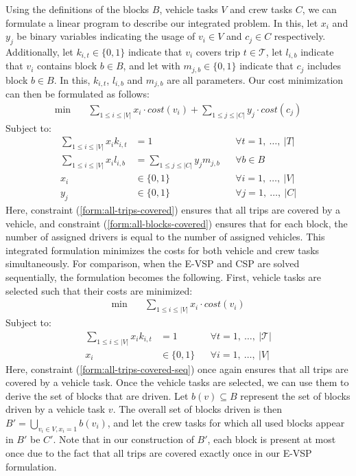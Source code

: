 \documentclass[]{article}
\begin{document}
Using the definitions of the blocks $B$, vehicle tasks $V$ and crew tasks $C$, we can formulate a linear program to describe our integrated problem. In this, let $x_i$ and $y_j$ be binary variables indicating the usage of $v_i \in V$ and $c_j \in C$ respectively. Additionally, let $k_{i,t} \in \{ 0, 1 \}$ indicate that $v_i$ covers trip $t \in \mathcal{T}$, let $l_{i,b}$ indicate that $v_i$ contains block $b \in B$, and let with $m_{j,b} \in \{ 0, 1 \} $ indicate that $c_j$ includes block $b \in B$. In this, $k_{i,t}$, $l_{i,b}$ and $m_{j,b}$ are all parameters. Our cost minimization can then be formulated as follows:
\begin{align}
\min \quad
& \sum_{1 \leq i \leq |V|} x_{i} \cdot cost(v_i) + \sum_{1 \leq j \leq |C|} y_{j} \cdot cost(c_j)  
\end{align}
Subject to:
\begin{align}
\sum_{1 \leq i \leq |V|} x_{i}k_{i,t} &= 1 && \forall t = 1,\:\dots,\:|T| \label{form:all-trips-covered} \\
\sum_{1 \leq i \leq |V|}x_i l_{i,b}  &= \sum_{1 \leq j \leq |C|}y_j m_{j,b}  && \forall b \in B \label{form:all-blocks-covered} \\
x_{i} &\in \{ 0, 1 \} && \forall i = 1,\:\dots,\:|V| \\
y_{j} &\in \{ 0, 1 \} && \forall j = 1,\:\dots,\:|C|
\end{align}
Here, constraint (\ref{form:all-trips-covered}) ensures that all trips are covered by a vehicle, and constraint (\ref{form:all-blocks-covered}) ensures that for each block, the number of assigned drivers is equal to the number of assigned vehicles. This integrated formulation minimizes the costs for both vehicle and crew tasks simultaneously. For comparison, when the E-VSP and CSP are solved sequentially, the formulation becomes the following. First, vehicle tasks are selected such that their costs are minimized:
\begin{align}
\min \quad
& \sum_{1 \leq i \leq |V|} x_{i} \cdot cost(v_i)
\end{align}
Subject to:
\begin{align}
\sum_{1 \leq i \leq |V|} x_{i}k_{i,t} &= 1 && \forall t = 1,\:\dots,\:|\mathcal{T}| \label{form:all-trips-covered-seq} \\
x_{i} &\in \{ 0, 1 \} && \forall i = 1,\:\dots,\:|V|
\end{align}
Here, constraint (\ref{form:all-trips-covered-seq}) once again ensures that all trips are covered by a vehicle task. Once the vehicle tasks are selected, we can use them to derive the set of blocks that are driven. Let $b(v) \subseteq B$ represent the set of blocks driven by a vehicle task $v$. The overall set of blocks driven is then $B' = \bigcup_{v_i \in V, x_i = 1}b(v_i)$, and let the crew tasks for which all used blocks appear in $B'$ be $C'$. Note that in our construction of $B'$, each block is present at most once due to the fact that all trips are covered exactly once in our E-VSP formulation. \\
\end{document}
